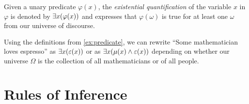 \begin{definition}
    Given a unary predicate $\varphi(x)$,
    the \emph{existential quantification} of the variable $x$ in $\varphi$
    is denoted by $\exists x \pn*{\varphi(x)}$
    and expresses that $\varphi(\omega)$ is true for at least one $\omega$ from our universe of discourse.
\end{definition}
\begin{example}
    Using the definitions from \autoref{ex:predicate},
    we can rewrite ``Some mathematician loves espresso'' as
    $\exists x \pn*{\varepsilon(x)}$ or as $\exists x \pn*{\mu(x) \meet \varepsilon(x)}$
    depending on whether our universe $\Omega$
    is the collection of all mathematicians or of all people.
\end{example}

\newpage

\section{Rules of Inference}

